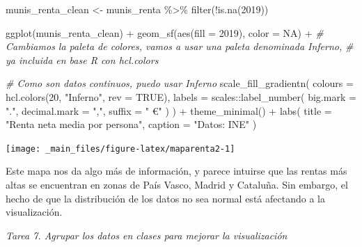 \documentclass[
]{book}
\newenvironment{Shaded}{\begin{snugshade}}{\end{snugshade}}
\newcommand{\AttributeTok}[1]{\textcolor[rgb]{0.77,0.63,0.00}{#1}}
\newcommand{\CommentTok}[1]{\textcolor[rgb]{0.56,0.35,0.01}{\textit{#1}}}
\newcommand{\ConstantTok}[1]{\textcolor[rgb]{0.00,0.00,0.00}{#1}}
\newcommand{\DecValTok}[1]{\textcolor[rgb]{0.00,0.00,0.81}{#1}}
\newcommand{\FunctionTok}[1]{\textcolor[rgb]{0.00,0.00,0.00}{#1}}
\newcommand{\NormalTok}[1]{#1}
\newcommand{\OtherTok}[1]{\textcolor[rgb]{0.56,0.35,0.01}{#1}}
\newcommand{\SpecialCharTok}[1]{\textcolor[rgb]{0.00,0.00,0.00}{#1}}
\newcommand{\StringTok}[1]{\textcolor[rgb]{0.31,0.60,0.02}{#1}}
\begin{document}
\begin{Shaded}
\begin{Highlighting}[]

\NormalTok{munis\_renta\_clean }\OtherTok{\textless{}{-}}\NormalTok{ munis\_renta }\SpecialCharTok{\%\textgreater{}\%} \FunctionTok{filter}\NormalTok{(}\SpecialCharTok{!}\FunctionTok{is.na}\NormalTok{(}\StringTok{\textasciigrave{}}\AttributeTok{2019}\StringTok{\textasciigrave{}}\NormalTok{))}

\FunctionTok{ggplot}\NormalTok{(munis\_renta\_clean) }\SpecialCharTok{+}
  \FunctionTok{geom\_sf}\NormalTok{(}\FunctionTok{aes}\NormalTok{(}\AttributeTok{fill =} \StringTok{\textasciigrave{}}\AttributeTok{2019}\StringTok{\textasciigrave{}}\NormalTok{), }\AttributeTok{color =} \ConstantTok{NA}\NormalTok{) }\SpecialCharTok{+}
  \CommentTok{\# Cambiamos la paleta de colores, vamos a usar una paleta denominada Inferno,}
  \CommentTok{\# ya incluida en base R con hcl.colors}

  \CommentTok{\# Como son datos continuos, puedo usar Inferno}
  \FunctionTok{scale\_fill\_gradientn}\NormalTok{(}
    \AttributeTok{colours =} \FunctionTok{hcl.colors}\NormalTok{(}\DecValTok{20}\NormalTok{, }\StringTok{"Inferno"}\NormalTok{, }\AttributeTok{rev =} \ConstantTok{TRUE}\NormalTok{),}
    \AttributeTok{labels =}\NormalTok{ scales}\SpecialCharTok{::}\FunctionTok{label\_number}\NormalTok{(}
      \AttributeTok{big.mark =} \StringTok{"."}\NormalTok{,}
      \AttributeTok{decimal.mark =} \StringTok{","}\NormalTok{,}
      \AttributeTok{suffix =} \StringTok{" €"}
\NormalTok{    )}
\NormalTok{  ) }\SpecialCharTok{+}
  \FunctionTok{theme\_minimal}\NormalTok{() }\SpecialCharTok{+}
  \FunctionTok{labs}\NormalTok{(}
    \AttributeTok{title =} \StringTok{"Renta neta media por persona"}\NormalTok{,}
    \AttributeTok{caption =} \StringTok{"Datos: INE"}
\NormalTok{  )}
\end{Highlighting}
\end{Shaded}

\begin{center}\texttt{[image: \_main\_files/figure-latex/maparenta2-1]} \end{center}

Este mapa nos da algo más de información, y parece intuirse que las rentas más
altas se encuentran en zonas de País Vasco, Madrid y Cataluña. Sin embargo, el
hecho de que la distribución de los datos no sea normal está afectando a la
visualización.

\emph{Tarea 7. Agrupar los datos en clases para mejorar la visualización}
\end{document}
